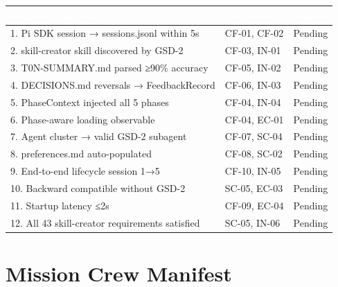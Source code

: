 \documentclass[11pt,letterpaper]{article}
\newcommand{\tableheader}[1]{\textbf{\sffamily\textcolor{white}{#1}}}
\begin{document}
\begin{center}
\begin{tabularx}{\textwidth}{XL{3.5cm}C{1.5cm}}
\toprule
{}
\tableheader{Success Criterion} & \tableheader{Test ID(s)} & \tableheader{Status} \\
. Pi SDK session → sessions.jsonl within 5s & CF-01, CF-02 & Pending \\
2. skill-creator skill discovered by GSD-2 & CF-03, IN-01 & Pending \\
3. T0N-SUMMARY.md parsed ≥90\% accuracy & CF-05, IN-02 & Pending \\
4. DECISIONS.md reversals → FeedbackRecord & CF-06, IN-03 & Pending \\
5. PhaseContext injected all 5 phases & CF-04, IN-04 & Pending \\
6. Phase-aware loading observable & CF-04, EC-01 & Pending \\
7. Agent cluster → valid GSD-2 subagent & CF-07, SC-04 & Pending \\
8. preferences.md auto-populated & CF-08, SC-02 & Pending \\
9. End-to-end lifecycle session 1→5 & CF-10, IN-05 & Pending \\
10. Backward compatible without GSD-2 & SC-05, EC-03 & Pending \\
11. Startup latency ≤2s & CF-09, EC-04 & Pending \\
12. All 43 skill-creator requirements satisfied & SC-05, IN-06 & Pending \\
\bottomrule
\end{tabularx}
\end{center}

\section{Mission Crew Manifest}
\end{document}
